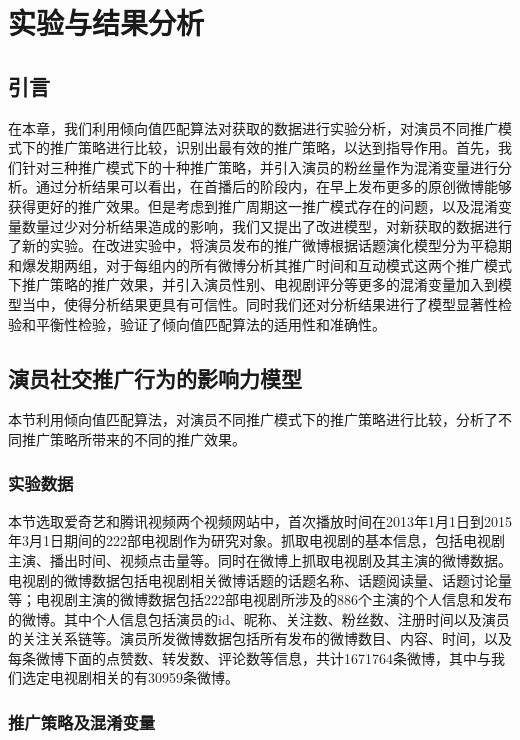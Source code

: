 \chapter{实验与结果分析}

\section{引言}

在本章，我们利用倾向值匹配算法对获取的数据进行实验分析，对演员不同推广模式下的推广策略进行比较，识别出最有效的推广策略，以达到指导作用。首先，我们针对三种推广模式下的十种推广策略，并引入演员的粉丝量作为混淆变量进行分析。通过分析结果可以看出，在首播后的阶段内，在早上发布更多的原创微博能够获得更好的推广效果。但是考虑到推广周期这一推广模式存在的问题，以及混淆变量数量过少对分析结果造成的影响，我们又提出了改进模型，对新获取的数据进行了新的实验。在改进实验中，将演员发布的推广微博根据话题演化模型分为平稳期和爆发期两组，对于每组内的所有微博分析其推广时间和互动模式这两个推广模式下推广策略的推广效果，并引入演员性别、电视剧评分等更多的混淆变量加入到模型当中，使得分析结果更具有可信性。同时我们还对分析结果进行了模型显著性检验和平衡性检验，验证了倾向值匹配算法的适用性和准确性。

\section{演员社交推广行为的影响力模型}

本节利用倾向值匹配算法，对演员不同推广模式下的推广策略进行比较，分析了不同推广策略所带来的不同的推广效果。

\subsection{实验数据}

本节选取爱奇艺和腾讯视频两个视频网站中，首次播放时间在2013年1月1日到2015年3月1日期间的222部电视剧作为研究对象。抓取电视剧的基本信息，包括电视剧主演、播出时间、视频点击量等。同时在微博上抓取电视剧及其主演的微博数据。电视剧的微博数据包括电视剧相关微博话题的话题名称、话题阅读量、话题讨论量等；电视剧主演的微博数据包括222部电视剧所涉及的886个主演的个人信息和发布的微博。其中个人信息包括演员的id、昵称、关注数、粉丝数、注册时间以及演员的关注关系链等。演员所发微博数据包括所有发布的微博数目、内容、时间，以及每条微博下面的点赞数、转发数、评论数等信息，共计1671764条微博，其中与我们选定电视剧相关的有30959条微博。

\subsection{推广策略及混淆变量}

